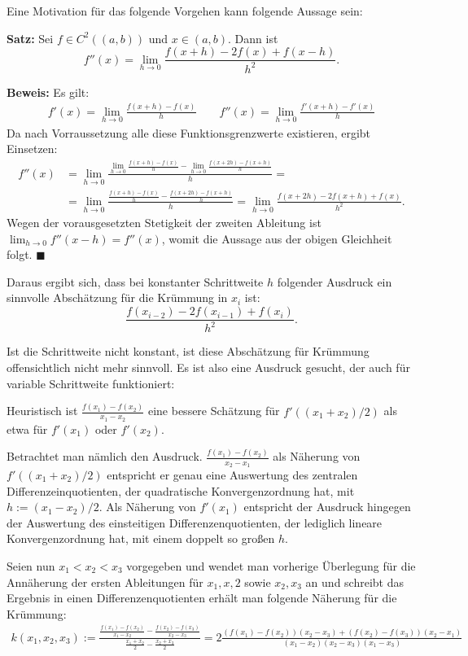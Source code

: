 \documentclass[a4paper,11pt,bibliography=totoc,listof=totoc,headinclude=true,cleardoublepage=empty,oneside]{scrartcl}
\begin{document}
Eine Motivation für das folgende Vorgehen kann folgende Aussage sein:

\textbf{Satz:} Sei $f \in C^2((a,b))$ und $x \in (a,b)$. Dann ist 
\[
f''(x) = \lim_{h \to 0} \frac{f(x+h) -2f(x) + f(x-h)}{h^2}.
\]

\textbf{Beweis:}
Es gilt:
\begin{align*}
f'(x) = \lim_{h \to 0} \frac{f(x+h)-f(x)}{h} \qquad  f''(x) = \lim_{h \to 0} \frac{f'(x+h)-f'(x)}{h}
\end{align*}
Da nach Vorraussetzung alle diese Funktionsgrenzwerte existieren, ergibt Einsetzen:
\begin{align*}
f''(x) &= \lim_{h \to 0} \frac{\lim_{h \to 0} \frac{f(x+h)-f(x)}{h}-\lim_{h \to 0} \frac{f(x+2h)-f(x+h)}{h}}{h} = \\
&=\lim_{h \to 0}  \frac{\frac{f(x+h)-f(x)}{h}- \frac{f(x+2h)-f(x+h)}{h}}{h} = \lim_{h \to 0} \frac{f(x+2h) -2f(x+h) + f(x)}{h^2}.
\end{align*}
Wegen der vorausgesetzten Stetigkeit der zweiten Ableitung ist $\lim_{h \to 0} f''(x-h)=f''(x)$, womit die Aussage aus der obigen Gleichheit folgt. \hfill $\blacksquare$

Daraus ergibt sich, dass bei konstanter Schrittweite $h$ folgender Ausdruck ein sinnvolle Abschätzung für die Krümmung in $x_i$ ist:
\[
\frac{f(x_{i-2})-2f(x_{i-1})+f(x_i)}{h^2}.
\]

Ist die Schrittweite nicht konstant, ist diese Abschätzung für Krümmung offensichtlich nicht mehr sinnvoll. Es ist also eine Ausdruck gesucht, der auch für variable Schrittweite funktioniert:

Heuristisch ist $\frac{f(x_1)-f(x_2)}{x_1-x_2}$ eine bessere Schätzung für $f'((x_1+x_2)/2)$ als etwa für $f'(x_1)$ oder $f'(x_2)$. 

Betrachtet man nämlich den Ausdruck. $\frac{f(x_1)-f(x_2)}{x_2-x_1}$  als Näherung von  $f'((x_1+x_2)/2)$ entspricht er genau eine Auswertung des zentralen Differenzeinquotienten, der quadratische Konvergenzordnung hat, mit $h:= (x_1-x_2)/2$. Als Näherung von $f'(x_1)$ entspricht der Ausdruck hingegen der Auswertung des einsteitigen Differenzenquotienten, der lediglich lineare Konvergenzordnung hat, mit einem doppelt so großen $h$.

Seien nun $x_1 < x_2 < x_3$ vorgegeben und wendet man vorherige Überlegung für die Annäherung der ersten Ableitungen für $x_1, x,2$ sowie $x_2,x_3$ an und schreibt das Ergebnis in einen Differenzenquotienten erhält man folgende Näherung für die Krümmung:
\begin{align*}
k(x_1,x_2,x_3) :=  \frac{\frac{f(x_1)-f(x_2)}{x_1-x_2} - \frac{f(x_2)-f(x_3)}{x_2-x_3}}{\frac{x_1+x_2}{2} - \frac{x_2+x_3}{2}  } 
=
2 \frac{(f(x_1)-f(x_2))(x_2-x_3) + (f(x_2)-f(x_3))(x_2-x_1)}{(x_1-x_2)(x_2-x_3)(x_1-x_3)}
\end{align*}
\end{document}
